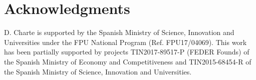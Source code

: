 

\section*{Acknowledgments}
  D. Charte is supported by the Spanish Ministry of Science, Innovation and Universities under the FPU National Program (Ref. FPU17/04069). This work has been partially supported by projects TIN2017-89517-P (FEDER Founds) of the Spanish Ministry of Economy and Competitiveness and TIN2015-68454-R of the Spanish Ministry of Science, Innovation and Universities.


  
